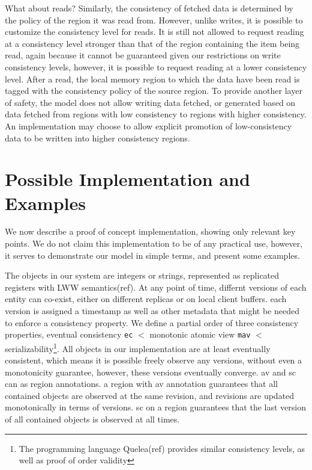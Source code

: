 \documentclass[preprint, numbers]{sigplanconf}
\begin{document}
What about reads? Similarly, the consistency of fetched data is determined by the
policy of the region it was read from. However, unlike writes, it is possible to
customize the consistency level for reads. It is still not allowed to request reading
at a consistency level stronger than that of the region containing the item
being read, again because it cannot be guaranteed given our restrictions on
write consistency levels, however, it is possible to
request reading at a lower consistency level. After a read, the local memory
region to which the data have been read is tagged with the consistency policy of
the source region. To provide another layer of safety, the model does not allow
writing data fetched, or generated based on data fetched from regions with low
consistency to regions with higher consistency. An implementation may choose to
allow explicit promotion of low-consistency data to be written into higher
consistency regions.

%


\section{Possible Implementation and Examples}
We now describe a proof of concept implementation, showing only
relevant key points. We do not claim this implementation to be of any practical
use, however, it serves to demonstrate our model in simple terms, and present some examples.

The objects in our system are integers or strings, represented as replicated registers with LWW
semantics(ref). At any point of time, differnt versions of each entity can
co-exist, either on different replicas or on local client buffers. each version
is assigned a timestamp as well as other metadata that might be needed to
enforce a consistency property. We define a partial order of three consistency properties, eventual
consistency \texttt{ec} $<$ monotonic atomic view \texttt{mav} $<$
serializability\footnote{The programming language Quelea(ref) provides similar
  consistency levels, as well as proof of order validity}. All
objects in our implementation are at least eventually consistent, which means it
is possible freely observe any versions, without even a monotonicity guarantee,
however, these versions eventually converge. av and sc can as region
annotations. a region with av annotation guarantees that all contained objects
are observed at the same revision, and revisions are updated monotonically in
terms of versions. sc on a region guarantees that the last version of all
contained objects is observed at all times. 
\end{document}
